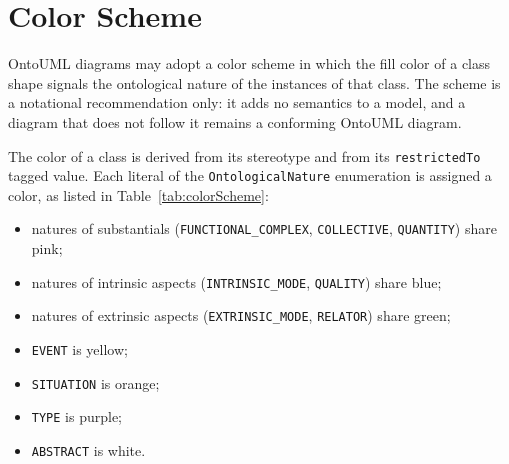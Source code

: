 \appendix 



\newcommand{\swatch}[1]{\fcolorbox{black}{#1}{\rule{0pt}{6pt}\rule{12pt}{0pt}}}

\chapter{Color Scheme}\label{annex:colorScheme}

OntoUML diagrams may adopt a color scheme in which the fill color of a class shape signals the ontological nature of the instances of that class. The scheme is a notational recommendation only: it adds no semantics to a model, and a diagram that does not follow it remains a conforming OntoUML diagram.

The color of a class is derived from its stereotype and from its \texttt{restrictedTo} tagged value. Each literal of the \texttt{OntologicalNature} enumeration is assigned a color, as listed in Table~\ref{tab:colorScheme}:

\begin{itemize}
  \item natures of substantials (\texttt{FUNCTIONAL\_COMPLEX}, \texttt{COLLECTIVE}, \texttt{QUANTITY}) share pink;
  \item natures of intrinsic aspects (\texttt{INTRINSIC\_MODE}, \texttt{QUALITY}) share blue;
  \item natures of extrinsic aspects (\texttt{EXTRINSIC\_MODE}, \texttt{RELATOR}) share green;
  \item \texttt{EVENT} is yellow;
  \item \texttt{SITUATION} is orange;
  \item \texttt{TYPE} is purple;
  \item \texttt{ABSTRACT} is white.
\end{itemize}

